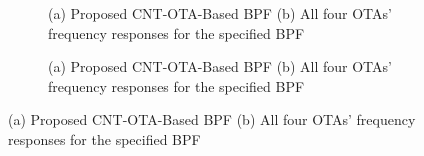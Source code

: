 \begin{figure}[htbp]
  \centering
  \begin{subfigure}[b]{0.48\linewidth}
    \centering
    \caption{(a) Proposed CNT-OTA-Based BPF (b) All four OTAs' frequency responses for the specified BPF}

  \end{subfigure}
  \hfill
  \begin{subfigure}[b]{0.48\linewidth}
    \centering
    \caption{(a) Proposed CNT-OTA-Based BPF (b) All four OTAs' frequency responses for the specified BPF}

  \end{subfigure}
  \caption{(a) Proposed CNT-OTA-Based BPF (b) All four OTAs' frequency responses for the specified BPF}

  \label{fig:group_7xrdu}
\end{figure}
